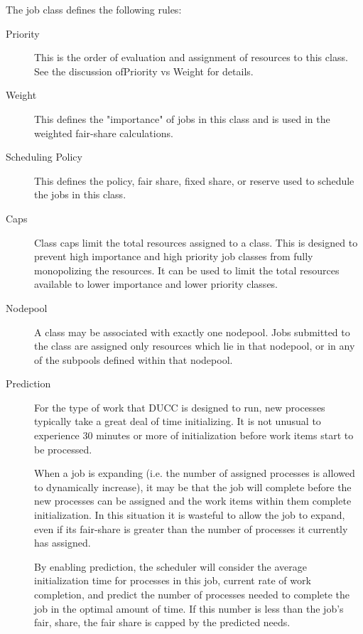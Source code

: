     The job class defines the following rules: 
    
    \begin{description}
        \item[Priority] This is the order of evaluation and assignment of resources to this class. See
          the discussion ofPriority vs Weight for details. 

        \item[Weight] This defines the "importance" of jobs in this class and is used in the weighted
          fair-share calculations. 

        \item[Scheduling Policy] This defines the policy, fair share, fixed share, or reserve used to
          schedule the jobs in this class.

        \item[Caps] Class caps limit the total resources assigned to a class. This is designed to prevent
          high importance and high priority job classes from fully monopolizing the resources. It can be
          used to limit the total resources available to lower importance and lower priority classes.

        \item[Nodepool] A class may be associated with exactly one nodepool. Jobs submitted to the class
          are assigned only resources which lie in that nodepool, or in any of the subpools defined
          within that nodepool.

        \item[Prediction] For the type of work that DUCC is designed to run, new processes typically take
          a great deal of time initializing. It is not unusual to experience 30 minutes or more of
          initialization before work items start to be processed.

          When a job is expanding (i.e. the number of assigned processes is allowed to dynamically 
          increase), it may be that the job will complete before the new processes can be assigned and 
          the work items within them complete initialization. In this situation it is wasteful to allow the 
          job to expand, even if its fair-share is greater than the number of processes it currently has 
          assigned. 
          
          By enabling prediction, the scheduler will consider the average initialization time for processes 
          in this job, current rate of work completion, and predict the number of processes needed to 
          complete the job in the optimal amount of time. If this number is less than the job's fair, share, 
          the fair share is capped by the predicted needs. 
          

\end{description}
